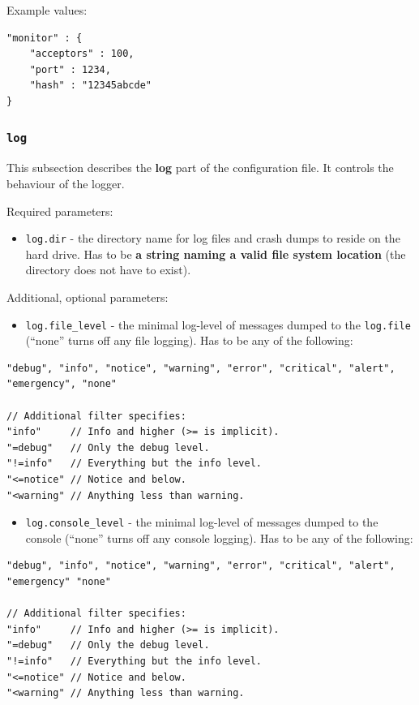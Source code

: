 \documentclass[a4paper]{article}
\begin{document}
\noindent
Example values:


\begin{verbatim}
"monitor" : {
    "acceptors" : 100,
    "port" : 1234,
    "hash" : "12345abcde"
}
\end{verbatim}
\subsubsection{\texttt{log}}
\label{sec-3-1-8}
\label{ref-log-config}

This subsection describes the \textbf{log} part of the configuration file. It controls the behaviour of the logger.

\noindent
Required parameters:

\begin{itemize}
\item \texttt{log.dir} - the directory name for log files and crash dumps to reside on the hard drive. Has to be \textbf{a string naming a valid file system location} (the directory does not have to exist).
\end{itemize}

\noindent
Additional, optional parameters:

\begin{itemize}
\item \texttt{log.file\_level} - the minimal log-level of messages dumped to the \texttt{log.file} (``none'' turns off any file logging). Has to be any of the following:
\end{itemize}


\begin{verbatim}
"debug", "info", "notice", "warning", "error", "critical", "alert", "emergency", "none"

// Additional filter specifies:
"info"     // Info and higher (>= is implicit).
"=debug"   // Only the debug level.
"!=info"   // Everything but the info level.
"<=notice" // Notice and below.
"<warning" // Anything less than warning.
\end{verbatim}





\begin{itemize}
\item \texttt{log.console\_level} - the minimal log-level of messages dumped to the console (``none'' turns off any console logging). Has to be any of the following:
\end{itemize}


\begin{verbatim}
"debug", "info", "notice", "warning", "error", "critical", "alert", "emergency" "none"

// Additional filter specifies:
"info"     // Info and higher (>= is implicit).
"=debug"   // Only the debug level.
"!=info"   // Everything but the info level.
"<=notice" // Notice and below.
"<warning" // Anything less than warning.
\end{verbatim}
\end{document}
